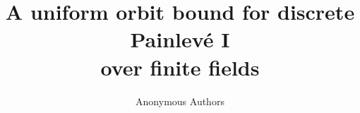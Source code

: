 \documentclass[11pt,letterpaper]{article}
\title{A uniform orbit bound for discrete Painlev\'e I\texorpdfstring{\\}{ }over finite fields}
\author{Anonymous Authors}
\date{}
\begin{document}
\maketitle
\begin{abstract}

\end{abstract}










\end{document}
